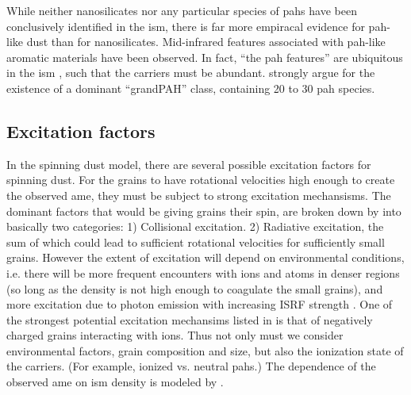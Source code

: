     While neither nanosilicates nor any particular species of \acrshort{pah}s have been conclusively identified in the \acrshort{ism}, there is far more empiracal evidence for \acrshort{pah}-like dust than for nanosilicates. Mid-infrared features associated with \acrshort{pah}-like aromatic materials have been observed. In fact, ``the \acrshort{pah} features'' are ubiquitous in the \acrshort{ism} \citep{giard94,onaka96,onaka00}, such that the carriers must be abundant. \cite{andrews15} strongly argue for the  existence of a dominant ``grandPAH'' class, containing 20 to 30 \acrshort{pah} species.

     \subsection{Excitation factors}
       In the spinning dust model, there are several possible excitation factors for spinning dust. For the grains to have rotational velocities high enough to create the observed \acrshort{ame}, they must be subject to strong excitation mechansisms. The dominant factors that would be giving grains their spin, are broken down by \cite{draine11} into basically two categories: 1) Collisional excitation. 2) Radiative excitation, the sum of which could lead to sufficient rotational velocities for sufficiently small grains. However the extent of excitation will depend on environmental conditions, i.e. there will be more frequent encounters with ions and atoms in denser regions (so long as the density is not high enough to coagulate the small grains), and more excitation due to photon emission with increasing ISRF strength \citep{ali-haimoud09, ali-haimoud14}. One of the strongest potential excitation mechansims listed in \cite{draine11} is that of negatively charged grains interacting with ions. Thus not only must we consider environmental factors, grain composition and size, but also the ionization state of the carriers. (For example, ionized vs. neutral \acrshort{pah}s.) The dependence of the observed \acrshort{ame} on \acrshort{ism} density is modeled by \cite{ali-haimoud10}.

